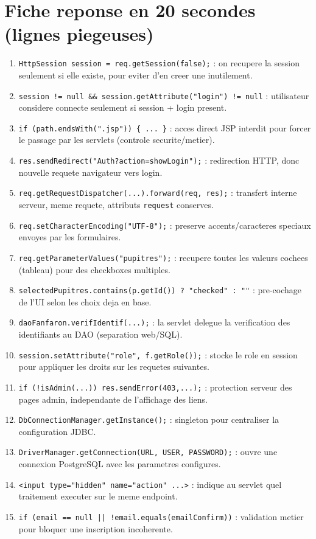 ﻿\documentclass[11pt,a4paper]{article}
\begin{document}
\section{Fiche reponse en 20 secondes (lignes piegeuses)}
\begin{enumerate}
  \item \texttt{HttpSession session = req.getSession(false);} : on recupere la session seulement si elle existe, pour eviter d'en creer une inutilement.
  \item \texttt{session != null \&\& session.getAttribute("login") != null} : utilisateur considere connecte seulement si session + login present.
  \item \texttt{if (path.endsWith(".jsp")) \{ ... \}} : acces direct JSP interdit pour forcer le passage par les servlets (controle securite/metier).
  \item \texttt{res.sendRedirect("Auth?action=showLogin");} : redirection HTTP, donc nouvelle requete navigateur vers login.
  \item \texttt{req.getRequestDispatcher(...).forward(req, res);} : transfert interne serveur, meme requete, attributs \texttt{request} conserves.
  \item \texttt{req.setCharacterEncoding("UTF-8");} : preserve accents/caracteres speciaux envoyes par les formulaires.
  \item \texttt{req.getParameterValues("pupitres");} : recupere toutes les valeurs cochees (tableau) pour des checkboxes multiples.
  \item \texttt{selectedPupitres.contains(p.getId()) ? "checked" : ""} : pre-cochage de l'UI selon les choix deja en base.
  \item \texttt{daoFanfaron.verifIdentif(...);} : la servlet delegue la verification des identifiants au DAO (separation web/SQL).
  \item \texttt{session.setAttribute("role", f.getRole());} : stocke le role en session pour appliquer les droits sur les requetes suivantes.
  \item \texttt{if (!isAdmin(...)) res.sendError(403,...);} : protection serveur des pages admin, independante de l'affichage des liens.
  \item \texttt{DbConnectionManager.getInstance();} : singleton pour centraliser la configuration JDBC.
  \item \texttt{DriverManager.getConnection(URL, USER, PASSWORD);} : ouvre une connexion PostgreSQL avec les parametres configures.
  \item \texttt{<input type="hidden" name="action" ...>} : indique au servlet quel traitement executer sur le meme endpoint.
  \item \texttt{if (email == null || !email.equals(emailConfirm))} : validation metier pour bloquer une inscription incoherente.
\end{enumerate}
\end{document}
